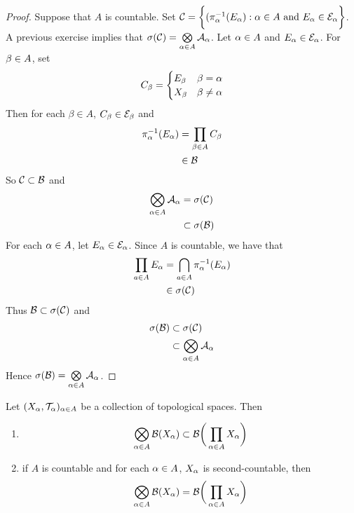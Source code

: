 \documentclass{book}
\begin{document}
 	\begin{proof}
 		Suppose that $A$ is countable. Set $\mathcal{C} =  \bigg \{ (\pi_{\alpha}^{-1}(E_{\alpha}): \alpha \in A \text{ and }E_{\alpha} \in \mathcal{E}_{\alpha} \bigg \}$. A previous exercise implies that $\sigma(\mathcal{C}) = \bigotimes\limits_{\alpha \in A} \mathcal{A}_{\alpha}$. Let $\alpha \in A$ and $E_{\alpha} \in \mathcal{E}_{\alpha}$. For $\beta \in A$, set 
 		\[
 		C_{\beta} = 
 		\begin{cases}
 			E_{\beta} & \beta = \alpha \\
 			X_{\beta} & \beta \neq \alpha
 		\end{cases}
 		\]
 		Then for each $\beta \in A$, $C_{\beta} \in \mathcal{E}_{\beta}$ and
 		\begin{align*}
 			\pi_{\alpha}^{-1}(E_{\alpha}) 
 			& = \prod_{\beta \in A} C_{\beta} \\
 			& \in \mathcal{B}
 		\end{align*}
 		So $\mathcal{C} \subset \mathcal{B}$ and 
 		\begin{align*}
 			\bigotimes\limits_{\alpha \in A} \mathcal{A}_{\alpha}
 			& = \sigma(\mathcal{C}) \\
 			& \subset \sigma(\mathcal{B})
 		\end{align*}
 		For each $\alpha \in A$, let $E_{\alpha} \in \mathcal{E}_{\alpha}$. Since $A$ is countable, we have that 
 		\begin{align*}
 			\prod_{a \in A} E_{\alpha} 
 			& = \bigcap_{a \in A} \pi_{\alpha}^{-1}(E_{\alpha}) \\
 			& \in \sigma(\mathcal{C}) 
 		\end{align*}
 		Thus $\mathcal{B} \subset \sigma(\mathcal{C})$ and 
 		\begin{align*}
 			\sigma(\mathcal{B})
 			& \subset \sigma(\mathcal{C}) \\ 
 			& \subset \bigotimes\limits_{\alpha \in A} \mathcal{A}_{\alpha} 
 		\end{align*}
 		Hence $\sigma(\mathcal{B}) = \bigotimes\limits_{\alpha \in A} \mathcal{A}_{\alpha}$.
 	\end{proof}
 
 	\begin{ex} 
 		Let $(X_{\alpha}, \mathcal{T}_{\alpha})_{\alpha \in A}$ be a collection of topological spaces. Then 
 		\begin{enumerate}
 			\item $$\bigotimes\limits_{\alpha \in A}  \mathcal{B}(X_{\alpha}) \subset \mathcal{B} \bigg( \prod_{\alpha \in A} X_{\alpha} \bigg)$$
 			\item if $A$ is countable and for each $\alpha \in A$, $X_{\alpha}$ is second-countable, then $$\bigotimes\limits_{\alpha \in A}  \mathcal{B}(X_{\alpha}) = \mathcal{B} \bigg( \prod_{\alpha \in A} X_{\alpha} \bigg)$$
 		\end{enumerate}
 	\end{ex}
 
\end{document}
